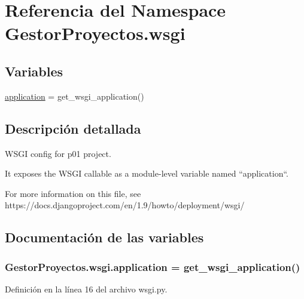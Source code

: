 \hypertarget{namespace_gestor_proyectos_1_1wsgi}{}\section{Referencia del Namespace Gestor\+Proyectos.\+wsgi}
\label{namespace_gestor_proyectos_1_1wsgi}
\subsection*{Variables}
\begin{DoxyCompactItemize}
\item 
\hyperlink{namespace_gestor_proyectos_1_1wsgi_a9a544331cc4b6400f6aa50e07498a523}{application} = get\+\_\+wsgi\+\_\+application()
\end{DoxyCompactItemize}


\subsection{Descripción detallada}
\begin{DoxyVerb}WSGI config for p01 project.

It exposes the WSGI callable as a module-level variable named ``application``.

For more information on this file, see
https://docs.djangoproject.com/en/1.9/howto/deployment/wsgi/
\end{DoxyVerb}
 

\subsection{Documentación de las variables}
\subsubsection[{\texorpdfstring{application}{application}}]{\setlength{\rightskip}{0pt plus 5cm}Gestor\+Proyectos.\+wsgi.\+application = get\+\_\+wsgi\+\_\+application()}\hypertarget{namespace_gestor_proyectos_1_1wsgi_a9a544331cc4b6400f6aa50e07498a523}{}\label{namespace_gestor_proyectos_1_1wsgi_a9a544331cc4b6400f6aa50e07498a523}


Definición en la línea 16 del archivo wsgi.\+py.

